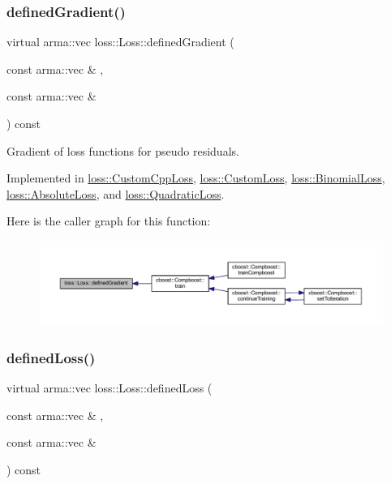 \subsubsection{\texorpdfstring{defined\+Gradient()}{definedGradient()}}
{\footnotesize\ttfamily virtual arma\+::vec loss\+::\+Loss\+::defined\+Gradient (\begin{DoxyParamCaption}\item[{const arma\+::vec \&}]{,  }\item[{const arma\+::vec \&}]{ }\end{DoxyParamCaption}) const\hspace{0.3cm}{\ttfamily [pure virtual]}}



Gradient of loss functions for pseudo residuals. 



Implemented in \mbox{\hyperlink{classloss_1_1_custom_cpp_loss_a3ff741b3a4d4c3f3515660dcb7b32781}{loss\+::\+Custom\+Cpp\+Loss}}, \mbox{\hyperlink{classloss_1_1_custom_loss_a3a79dc019e781c2956b52fb8e1cfcc56}{loss\+::\+Custom\+Loss}}, \mbox{\hyperlink{classloss_1_1_binomial_loss_a47a27e1be3e7f2c275046b42557ca21a}{loss\+::\+Binomial\+Loss}}, \mbox{\hyperlink{classloss_1_1_absolute_loss_a1886fc8ca065c6f0a207b7a8a0f8444d}{loss\+::\+Absolute\+Loss}}, and \mbox{\hyperlink{classloss_1_1_quadratic_loss_adb4da1acbad702b5ba8570abaa17d373}{loss\+::\+Quadratic\+Loss}}.

Here is the caller graph for this function\+:\nopagebreak
\begin{figure}[H]
\begin{center}
\leavevmode
\includegraphics[width=350pt]{classloss_1_1_loss_a267a4de70747ade4b2d84ce35a448979_icgraph}
\end{center}
\end{figure}
\mbox{\label{classloss_1_1_loss_ae9f94dd9b8311397583ba3a9cb485e94}} 
\subsubsection{\texorpdfstring{defined\+Loss()}{definedLoss()}}
{\footnotesize\ttfamily virtual arma\+::vec loss\+::\+Loss\+::defined\+Loss (\begin{DoxyParamCaption}\item[{const arma\+::vec \&}]{,  }\item[{const arma\+::vec \&}]{ }\end{DoxyParamCaption}) const\hspace{0.3cm}{\ttfamily [pure virtual]}}



